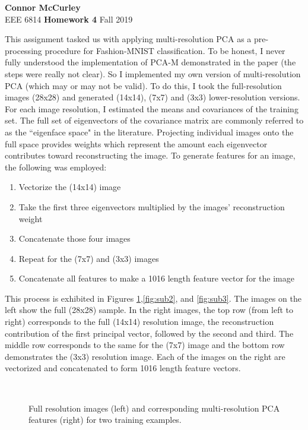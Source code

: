 \documentclass{article}[12 pt]
\begin{document}
	
\begin{center}
	\textbf{\Large Connor McCurley} \\
	EEE 6814 \qquad \textbf{\large Homework 4} \qquad Fall 2019 
\end{center}


This assignment tasked us with applying multi-resolution PCA as a pre-processing procedure for Fashion-MNIST classification. To be honest, I never fully understood the implementation of PCA-M demonstrated in the paper (the steps were really not clear). So I implemented my own version of multi-resolution PCA (which may or may not be valid).   To do this, I took the full-resolution images (28x28) and generated (14x14), (7x7) and (3x3) lower-resolution versions.  For each image resolution, I estimated the means and covariances of the training set.  The full set of eigenvectors of the covariance matrix are commonly referred to as the  ``eigenface space" in the literature.  Projecting individual images onto the full space provides weights which represent the amount each eigenvector contributes toward reconstructing the image.   To generate features for an image, the following was employed:

\begin{enumerate}
	\item Vectorize the (14x14) image
	\item Take the first three eigenvectors multiplied by the images' reconstruction weight
	\item Concatenate those four images
	\item Repeat for the (7x7) and (3x3) images
	\item Concatenate all features to make a 1016 length feature vector for the image 
\end{enumerate}

\noindent
This process is exhibited in Figures \ref{fig:sub1},\ref{fig:sub2}, and \ref{fig:sub3}.  The images on the left show the full (28x28) sample. In the right images, the top row (from left to right) corresponds to the full (14x14) resolution image, the reconstruction contribution of the first principal vector, followed by the second and third.  The middle row corresponds to the same for the (7x7) image and the bottom row demonstrates the (3x3) resolution image.  Each of the images on the right are vectorized and concatenated to form 1016 length feature vectors.
\vspace{-0.3cm}

\begin{figure}[h]
	\centering
	\quad
	\\
	\quad
	\caption{Full resolution images (left) and corresponding multi-resolution PCA features (right) for two training examples.}
	\label{fig:sub1}
\end{figure}
\end{document}
